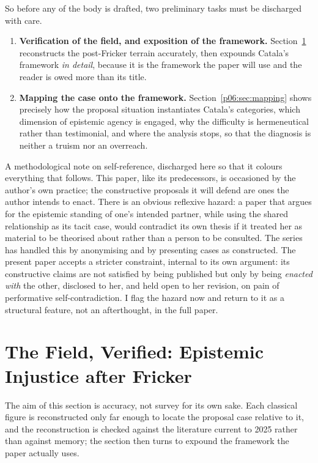 So before any of the body is drafted, two preliminary tasks must be discharged with care.

\begin{enumerate}
\item \textbf{Verification of the field, and exposition of the framework.} Section~\ref{p06:sec:literature} reconstructs the post-Fricker terrain accurately, then expounds Catala's framework \emph{in detail}, because it is the framework the paper will use and the reader is owed more than its title.
\item \textbf{Mapping the case onto the framework.} Section~\ref{p06:sec:mapping} shows precisely how the proposal situation instantiates Catala's categories, which dimension of epistemic agency is engaged, why the difficulty is hermeneutical rather than testimonial, and where the analysis stops, so that the diagnosis is neither a truism nor an overreach.
\end{enumerate}

A methodological note on self-reference, discharged here so that it colours everything that follows. This paper, like its predecessors, is occasioned by the author's own practice; the constructive proposals it will defend are ones the author intends to enact. There is an obvious reflexive hazard: a paper that argues for the epistemic standing of one's intended partner, while using the shared relationship as its tacit case, would contradict its own thesis if it treated her as material to be theorised about rather than a person to be consulted. The series has handled this by anonymising and by presenting cases as constructed. The present paper accepts a stricter constraint, internal to its own argument: its constructive claims are not satisfied by being published but only by being \emph{enacted with} the other, disclosed to her, and held open to her revision, on pain of performative self-contradiction. I flag the hazard now and return to it as a structural feature, not an afterthought, in the full paper.

\section{The Field, Verified: Epistemic Injustice after Fricker}\label{p06:sec:literature}

The aim of this section is accuracy, not survey for its own sake. Each classical figure is reconstructed only far enough to locate the proposal case relative to it, and the reconstruction is checked against the literature current to 2025 rather than against memory; the section then turns to expound the framework the paper actually uses.

